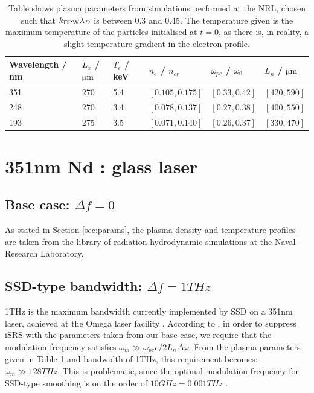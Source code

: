 \begin{table}[h]
\begin{center}

\begin{tabular}{|l|l|l|l|l|l|}
\hline
Wavelength / nm & $L_x$ /$\si{\micro\metre}$ & $T_e$ / keV & $n_e$ / $n_{cr}$ & $\omega_{pe}$ / $\omega_0$ & $L_n$ / $\si{\micro\metre}$
\\ \hline 
351 & 270 & 5.4 & $[0.105,0.175]$ & $[0.33,0.42]$ & $[420,590]$ \\ \hline
248 & 270 & 3.4 & $[0.078,0.137]$ & $[0.27,0.38]$ & $[400,550]$ \\ \hline
193 & 275 & 3.5 & $[0.071,0.140]$ & $[0.26,0.37]$ & $[330,470]$ \\ \hline

\end{tabular}

\end{center}
\caption{Table shows plasma parameters from simulations performed at the NRL, chosen such that $k_\mathrm{EPW}\lambda_D$ is between 0.3 and 0.45. The temperature given is the maximum temperature of the particles initialised at $t=0$, as there is, in reality, a slight temperature gradient in the electron profile.}
\label{tab:plasma}
\end{table}




\section{351nm Nd : glass laser}\label{sec:351}

\subsection{Base case: $\Delta f=0$}
As stated in Section \ref{sec:params}, the plasma density and temperature profiles are taken from the library of radiation hydrodynamic simulations at the Naval Research Laboratory. 

\subsection{SSD-type bandwidth: $\Delta f=1\si{THz}$}
1THz is the maximum bandwidth currently implemented by SSD on a 351nm laser, achieved at the Omega laser facility \citep{Regan2005}. According to \citet{Wen2021}, in order to suppress iSRS with the parameters taken from our base case, we require that the modulation frequency satisfies $\omega_m \gg \omega_{pe} c / 2L_n\Delta\omega$. From the plasma parameters given in Table \ref{tab:plasma} and bandwidth of 1THz, this requirement becomes: $\omega_m \gg 128 \si{THz}$. This is problematic, since the optimal modulation frequency for SSD-type smoothing is on the order of $10 \si{GHz} = 0.001 \si{THz}$ \citep{Regan2005,Kelly2013}.

